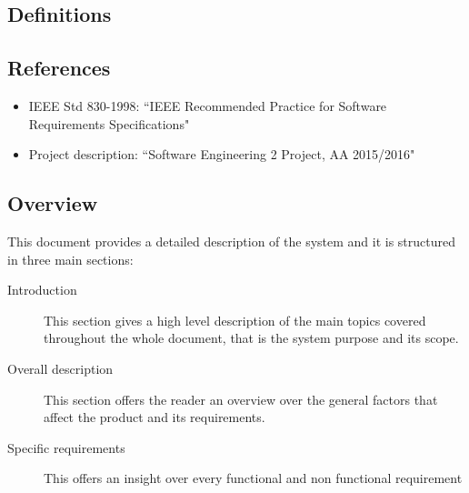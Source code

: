 \documentclass[12pt, a4paper]{article}
\begin{document}
\subsection{Definitions}

\subsection{References}
\begin{itemize}
\item IEEE Std 830-1998: ``IEEE Recommended Practice for Software Requirements Specifications"
\item Project description: ``Software Engineering 2 Project, AA 2015/2016"
\end{itemize}


\subsection{Overview}
This document provides a detailed description of the system and it is structured in three main sections:

\begin{description}
  \item[Introduction] This section gives a high level description of the main topics covered throughout the whole document, that is the system purpose and its scope.
  \item[Overall description] This section offers the reader an overview over the general factors that affect the product and its requirements.
  \item[Specific requirements] This offers an insight over every functional and non functional requirement
\end{description}
\end{document}
